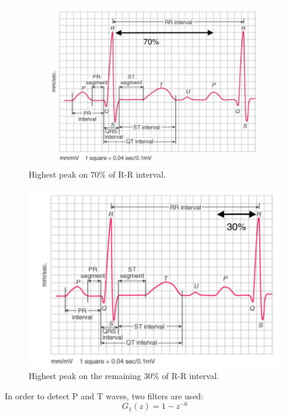 \documentclass{article}
\begin{document}
\begin{figure}[htbp]

\centerline{\includegraphics[scale=0.5]{T_70.png}}
\caption{Highest peak on 70\% of R-R interval.}

\end{figure}

\begin{figure}[htbp]

\centerline{\includegraphics[scale=0.5]{P_30_30.png}}
\caption{Highest peak on the remaining 30\% of R-R interval.}

\end{figure}


In order to detect P and T waves, two filters are used:
 \begin{equation}
     G_1(z) = 1 -z^{-6}
 \end{equation}
 
\end{document}
